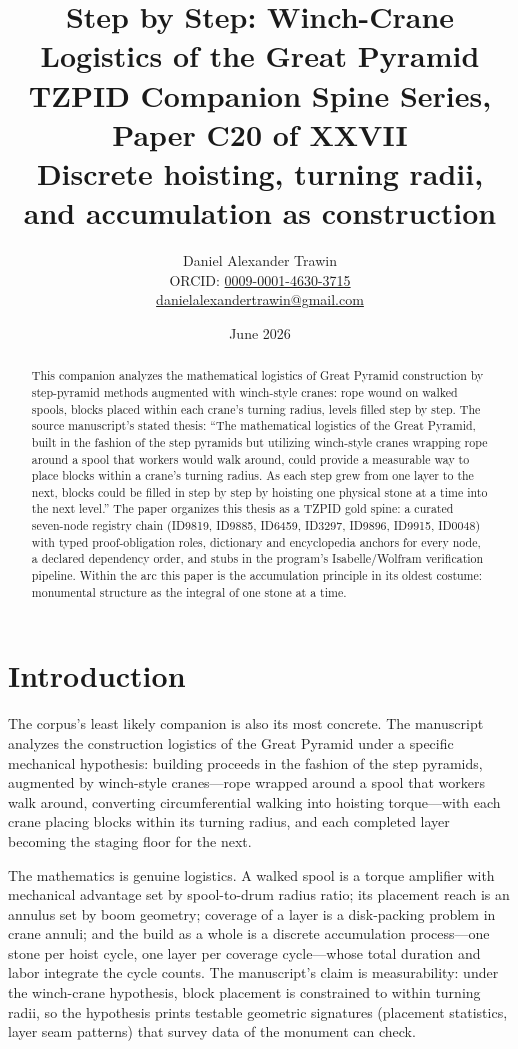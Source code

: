 \documentclass[11pt]{article}
\title{Step by Step: Winch-Crane Logistics of the Great Pyramid\\[0.6em]
\large TZPID Companion Spine Series, Paper C20 of XXVII\\
\normalsize Discrete hoisting, turning radii, and accumulation as construction}
\author{Daniel Alexander Trawin\\
\small ORCID: \href{https://orcid.org/0009-0001-4630-3715}{0009-0001-4630-3715}\\
\small \href{mailto:danielalexandertrawin@gmail.com}{danielalexandertrawin@gmail.com}}
\date{June 2026}
\theoremstyle{remark}
\begin{document}
\maketitle

\begin{abstract}
This companion analyzes the mathematical logistics of Great Pyramid construction by step-pyramid methods augmented with winch-style cranes: rope wound on walked spools, blocks placed within each crane's turning radius, levels filled step by step.
The source manuscript's stated thesis: ``The mathematical logistics of the Great Pyramid, built in the fashion of the step pyramids but utilizing winch-style cranes wrapping rope around a spool that workers would walk around, could provide a measurable way to place blocks within a crane's turning radius. As each step grew from one layer to the next, blocks could be filled in step by step by hoisting one physical stone at a time into the next level.'' The paper organizes this thesis as a TZPID gold spine: a curated seven-node registry chain (ID9819, ID9885, ID6459, ID3297, ID9896, ID9915, ID0048) with typed proof-obligation roles, dictionary and encyclopedia anchors for every node, a declared dependency order, and stubs in the program's Isabelle/Wolfram verification pipeline. Within the arc this paper is the accumulation principle in its oldest costume: monumental structure as the integral of one stone at a time.
\end{abstract}

\section{Introduction}
\label{sec:intro}

The corpus's least likely companion is also its most concrete. The manuscript analyzes the construction logistics of the Great Pyramid under a specific mechanical hypothesis: building proceeds in the fashion of the step pyramids, augmented by winch-style cranes---rope wrapped around a spool that workers walk around, converting circumferential walking into hoisting torque---with each crane placing blocks within its turning radius, and each completed layer becoming the staging floor for the next.

The mathematics is genuine logistics. A walked spool is a torque amplifier with mechanical advantage set by spool-to-drum radius ratio; its placement reach is an annulus set by boom geometry; coverage of a layer is a disk-packing problem in crane annuli; and the build as a whole is a discrete accumulation process---one stone per hoist cycle, one layer per coverage cycle---whose total duration and labor integrate the cycle counts. The manuscript's claim is measurability: under the winch-crane hypothesis, block placement is constrained to within turning radii, so the hypothesis prints testable geometric signatures (placement statistics, layer seam patterns) that survey data of the monument can check.
\end{document}
